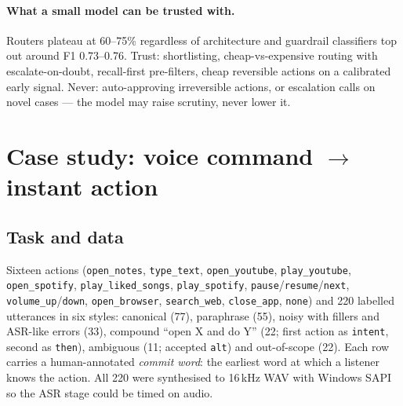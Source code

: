 \documentclass[11pt,a4paper]{article}
\newcommand{\code}[1]{\texttt{#1}}
\begin{document}
\paragraph{What a small model can be trusted with.} Routers plateau at 60--75\% regardless of architecture and guardrail classifiers top out around F1 0.73--0.76. Trust: shortlisting, cheap-vs-expensive routing with escalate-on-doubt, recall-first pre-filters, cheap reversible actions on a calibrated early signal. Never: auto-approving irreversible actions, or escalation calls on novel cases --- the model may raise scrutiny, never lower it.

\section{Case study: voice command $\to$ instant action}
\label{sec:voice}

\subsection{Task and data}
Sixteen actions (\code{open\_notes}, \code{type\_text}, \code{open\_youtube}, \code{play\_youtube}, \code{open\_spotify}, \code{play\_liked\_songs}, \code{play\_spotify}, \code{pause}/\code{resume}/\code{next}, \code{volume\_up}/\code{down}, \code{open\_browser}, \code{search\_web}, \code{close\_app}, \code{none}) and 220 labelled utterances in six styles: canonical (77), paraphrase (55), noisy with fillers and ASR-like errors (33), compound ``open X and do Y'' (22; first action as \code{intent}, second as \code{then}), ambiguous (11; accepted \code{alt}) and out-of-scope (22). Each row carries a human-annotated \emph{commit word}: the earliest word at which a listener knows the action. All 220 were synthesised to 16\,kHz WAV with Windows SAPI so the ASR stage could be timed on audio.
\end{document}
